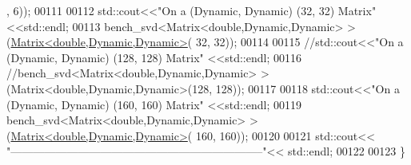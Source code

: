 \begin{DoxyCode}
      , 6));
00111   
00112   std::cout<<\textcolor{stringliteral}{"On a (Dynamic, Dynamic) (32, 32) Matrix"} <<std::endl;
00113   bench\_svd<Matrix<double,Dynamic,Dynamic> >(\hyperlink{group___core___module_class_eigen_1_1_matrix}{Matrix<double,Dynamic,Dynamic>}(
      32, 32));
00114 
00115   \textcolor{comment}{//std::cout<<"On a (Dynamic, Dynamic) (128, 128) Matrix" <<std::endl;}
00116   \textcolor{comment}{//bench\_svd<Matrix<double,Dynamic,Dynamic> >(Matrix<double,Dynamic,Dynamic>(128, 128));}
00117 
00118   std::cout<<\textcolor{stringliteral}{"On a (Dynamic, Dynamic) (160, 160) Matrix"} <<std::endl;
00119   bench\_svd<Matrix<double,Dynamic,Dynamic> >(\hyperlink{group___core___module_class_eigen_1_1_matrix}{Matrix<double,Dynamic,Dynamic>}(
      160, 160));
00120   
00121   std::cout<< \textcolor{stringliteral}{"--------------------------------------------------------------------"}<< std::endl;
00122            
00123 \}
\end{DoxyCode}

